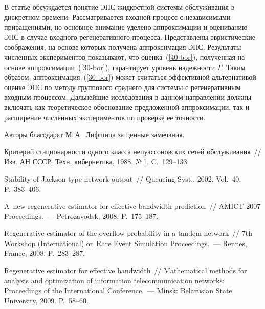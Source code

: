 \begin{multicols}{2}
\vspace*{-2pt}

В статье обсуждается понятие ЭПС жидкостной сис\-те\-мы обслуживания в дискретном времени.
 Рас\-смат\-ри\-ва\-ет\-ся  входной процесс с независимыми приращениями, но  основное внимание
уделено  аппроксимации и  оцениванию  ЭПС  в случае входного
регенеративного процесса.
 Представлены  эвристические соображения, на основе
которых получена аппроксимация  ЭПС. Результаты численных
экспериментов   показывают, что оценка~(\ref{40-bor}), полученная на
основе аппроксимации~(\ref{30-bor}), гарантирует  уровень надежности
$\Gamma$. Таким образом,  аппроксимация~(\ref{30-bor}) может считаться
эффективной альтернативой оценке ЭПС по методу группового среднего
для системы с регенеративным входным процессом. Дальнейшие
исследования   в данном направлении  должны включать как
теоретическое обоснование предложенной аппроксимации, так и
расширение численных экспериментов по проверке ее точ\-ности.

\bigskip

Авторы благодарят М.\,А.~Лифшица за  ценные замечания.

{\small\frenchspacing
{%
\begin{thebibliography}{99}

 Критерий стационарности одного класса непуассоновских
сетей обслуживания~// Изв. АН СССР. Техн. кибернетика, 1988. №\,1. C.~129--133.

 Stability of Jackson type network output~//
Queueing Syst., 2002. Vol.~40. P.~383--406.

 A~new
regenerative estimator for effective bandwidth prediction~// 
AMICT 2007 Proceedings.~--- Petrozavodsk, 2008. P.~175--187.

  Regenerative estimator of the overflow probability in a
 tandem network~// 7th  Workshop (International)
 on Rare Event Simulation Proceedings.~---  Rennes, France, 2008. P.~283--287.

  Regenerative estimator for
effective bandwidth~// Mathematical  methods for analysis and
optimization of information telecommunication networks: Proceedings
of  the International Conference.~--- Minsk: Belarusian State
University, 2009. P.~58--60.


\end{thebibliography}}}
\end{multicols}
